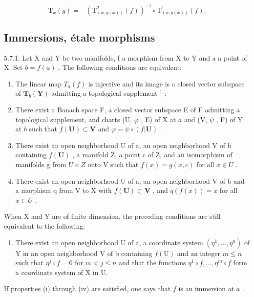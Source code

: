 \[
\mathrm{T} _ {x} (g) = - \left(\mathrm{T} _ {(x, g (x))} ^ {2} (f)\right) ^ {- 1} \circ \mathrm{T} _ {(x, g (x))} ^ {1} (f).
\]

\subsection{Immersions, étale morphisms}

5.7.1. Let X and Y be two manifolds, f a morphism from X to Y and a a point of X. Set \(b = f(a)\) . The following conditions are equivalent:

\begin{enumerate}
\def\labelenumi{(\roman{enumi})}
\item
  The linear map \(T_{a}(f)\) is injective and its image is a closed vector subspace of \(\mathbf{T}_{b}(\mathbf{Y})\) admitting a topological supplement \(^{1}\) ;
\item
  There exist a Banach space F, a closed vector subspace E of F admitting a topological supplement, and charts (U, \(\varphi\) , E) of X at \(a\) and (V, \(\psi\) , F) of Y at \(b\) such that \(f(\mathbf{U}) \subset \mathbf{V}\) and \(\varphi = \psi \circ (f|\mathbf{U})\) .
\item
  There exist an open neighborhood U of a, an open neighborhood V of b containing \(f(\mathbf{U})\) , a manifold Z, a point c of Z, and an isomorphism of manifolds g from \(U \times Z\) onto V such that \(f(x) = g(x, c)\) for all \(x \in U\) .
\item
  There exist an open neighborhood U of a, an open neighborhood V of b and a morphism q from V to X with \(f(\mathbf{U}) \subset \mathbf{V}\) , and \(q(f(x)) = x\) for all \(x \in U\) .
\end{enumerate}

When X and Y are of finite dimension, the preceding conditions are still equivalent to the following:

\begin{enumerate}
\def\labelenumi{(\alph{enumi})}
\setcounter{enumi}{21}
\tightlist
\item
  There exist an open neighborhood U of a, a coordinate system \((\eta^{1},\ldots,\eta^{n})\) of Y in an open neighborhood V of b containing \(f(\mathrm{U})\) and an integer \(m\leqslant n\) such that \(\eta^{j}\circ f=0\) for \(m<j\leqslant n\) and that the functions \(\eta^{1}\circ f,\ldots,\eta^{m}\circ f\) form a coordinate system of X in U.
\end{enumerate}

If properties (i) through (iv) are satisfied, one says that \(f\) is an immersion at \(a\) .

